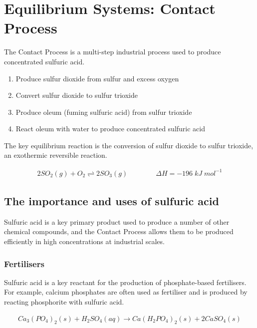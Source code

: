 \documentclass[12pt, a4paper]{article}
\begin{document}
\maketitle





\section{Equilibrium Systems: Contact Process}

The Contact Process is a multi-step industrial process used to produce concentrated sulfuric acid. 

\begin{enumerate}
	\item Produce sulfur dioxide from sulfur and excess oxygen
	\item Convert sulfur dioxide to sulfur trioxide
	\item Produce oleum (fuming sulfuric acid) from sulfur trioxide
	\item React oleum with water to produce concentrated sulfuric acid
\end{enumerate}

The key equilibrium reaction is the conversion of sulfur dioxide to sulfur trioxide, an exothermic reversible reaction.

\begin{align}
	2SO_{2}(g) + O_{2} \rightleftharpoons 2SO_{3}(g) \qquad \qquad \Delta H = -196 \; kJ \; mol^{-1}
\end{align}


\subsection{The importance and uses of sulfuric acid}

Sulfuric acid is a key primary product used to produce a number of other chemical compounds, and the Contact Process allows them to be produced efficiently in high concentrations at industrial scales. 

\subsubsection{Fertilisers}
Sulfuric acid is a key reactant for the production of phosphate-based fertilisers. For example, calcium phosphates are often used as fertiliser and is produced by reacting phosphorite with sulfuric acid.

\begin{align}
	Ca_{3}(PO_{4})_{2}(s) + H_{2}SO_{4}(aq) \rightarrow Ca(H_{2}PO_{4})_{2}(s) + 2CaSO_{4}(s)
\end{align}
\end{document}
